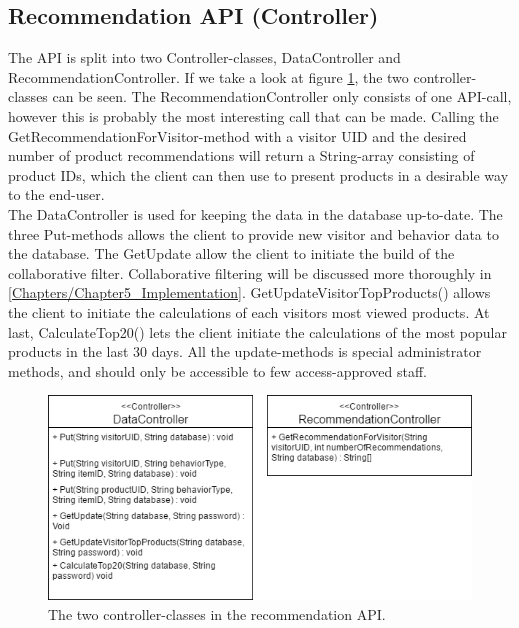 \subsection{Recommendation API (Controller)}
The API is split into two Controller-classes, DataController and RecommendationController. If we take a look at figure \ref{fig:ControllerClasses}, the two controller-classes can be seen. The RecommendationController only consists of one API-call, however this is probably the most interesting call that can be made. Calling the GetRecommendationForVisitor-method with a visitor UID and the desired number of product recommendations will return a String-array consisting of product IDs, which the client can then use to present products in a desirable way to the end-user.\\
The DataController is used for keeping the data in the database up-to-date. The three Put-methods allows the client to provide new visitor and behavior data to the database. The GetUpdate allow the client to initiate the build of the collaborative filter. Collaborative filtering will be discussed more thoroughly in \ref{Chapters/Chapter5_Implementation}. GetUpdateVisitorTopProducts() allows the client to initiate the calculations of each visitors most viewed products. At last, CalculateTop20() lets the client initiate the calculations of the most popular products in the last 30 days. All the update-methods is special administrator methods, and should only be accessible to few access-approved staff.

\begin{figure}
	\centering
	\includegraphics[width=.6\linewidth]{Figures/ControllerClasses.png}
	\caption{The two controller-classes in the recommendation API.}
	\label{fig:ControllerClasses}
\end{figure}

